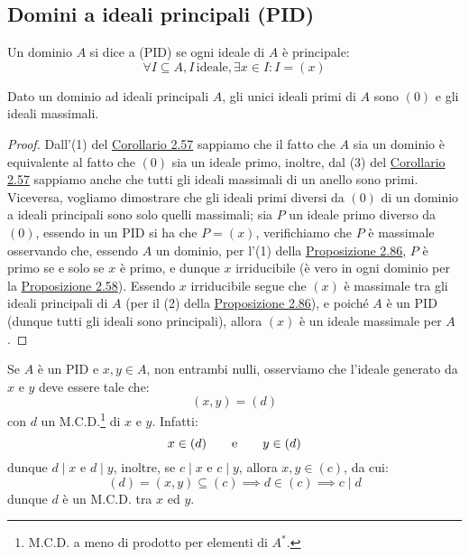 \documentclass[11pt]{scrartcl}
\begin{document}
\newpage
\subsection{Domini a ideali principali (PID)}
\begin{definition}
    Un dominio $A$ si dice a  (PID) se ogni ideale di $A$ è principale:
    \[ \forall I \subseteq A, I \, \text{ideale}, \exists x \in I : I = (x)
        \]
\end{definition}

\begin{proposition}
    \label{2.95}
    Dato un dominio ad ideali principali $A$, gli unici ideali primi di $A$ sono $(0)$ e gli ideali massimali.
\end{proposition}

\begin{proof}
    Dall'(1) del \hyperref[2.57]{Corollario 2.57} sappiamo che il fatto che $A$ sia un dominio è equivalente al fatto che $(0)$ sia un ideale
    primo, inoltre, dal (3) del \hyperref[2.57]{Corollario 2.57} sappiamo anche che tutti gli ideali massimali di un anello sono primi.\\
    Viceversa, vogliamo dimostrare che gli ideali primi diversi da $(0)$ di un dominio a ideali principali sono solo quelli massimali; sia $P$ un ideale primo diverso da $(0)$, essendo in un PID si ha che
    $P = (x)$, verifichiamo che $P$ è massimale osservando che, essendo $A$ un dominio, per l'(1) della \hyperref[2.86]{Proposizione 2.86}, $P$ è primo se e solo se $x$ è primo, e dunque $x$ irriducibile (è vero in ogni dominio per la \hyperref[2.58]{Proposizione 2.58}).
    Essendo $x$ irriducibile segue che $(x)$ è massimale tra gli ideali principali di $A$ (per il (2) della \hyperref[2.86]{Proposizione 2.86}), e poiché $A$ è un PID (dunque tutti gli ideali sono principali), allora $(x)$ è un ideale massimale per $A$. 
\end{proof}

\begin{remark}
    Se $A$ è un PID e $x,y \in A$, non entrambi nulli, osserviamo che l'ideale generato da $x$ e $y$ deve essere tale che:
    \[ (x,y) = (d)
        \]
    con $d$ un M.C.D.\footnote{M.C.D. a meno di prodotto per elementi di $A^*$.} di $x$ e $y$. Infatti:
    \[ x \in (d) \qquad \text e \qquad y \in (d)
        \]
    dunque $d \mid x$ e $d \mid y$, inoltre, se $c \mid x$ e $c \mid y$, allora $x,y \in (c)$, da cui:
    \[ (d) = (x,y) \subseteq (c) \implies d \in (c) \implies c \mid d
        \]
    dunque $d$ è un M.C.D. tra $x$ ed $y$.
\end{remark}
\end{document}
